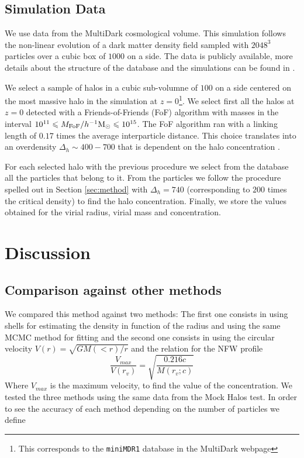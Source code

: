 \documentclass[useAMS,usenatbib]{mn2e}
\newcommand{\hMpc}{{\ifmmode{h^{-1}{\rm Mpc}}\else{$h^{-1}$Mpc }\fi}}
\newcommand{\hMsun}{{\ifmmode{h^{-1}{\rm
        {M_{\odot}}}}\else{$h^{-1}{\rm{M_{\odot}}}$~}\fi}}
\begin{document}
\subsection{Simulation Data}
\label{sec:data}

We use data from the MultiDark cosmological volume. This simulation
follows the non-linear evolution of a dark matter density field
sampled with $2048^3$ particles over a cubic box of $1000$ \hMpc on a
side. The data is publicly available, more details about the structure
of the database and the simulations can be found in
\citep{2013AN....334..691R}.

We select a sample of halos in a cubic sub-volumne of $100$ \hMpc on a
side centered on the most massive halo in the simulation at
$z=0$\footnote{This corresponds to the \texttt{miniMDR1} database in
  the MultiDark webpage}. We select first all the halos at $z=0$
detected with a Friends-of-Friends (FoF) algorithm with masses in the
interval $10^{11}\leq M_{\rm FoF}/\hMsun \leq 10^{15}$. The FoF
algorithm ran with a linking length of $0.17$ times the average
interparticle distance. This choice translates into an overdensity
$\Delta_h\sim 400-700$ that is dependent on the halo concentration
\citep{More2011}.

For each selected halo with the previous procedure we select from the database
all the particles that belong to it. From the particles we follow the
procedure spelled out in Section \ref{sec:method} with $\Delta_h=740$
(corresponding to $200$ times the critical density) to find the
halo concentration. Finally, we store the values obtained for the
virial radius, virial mass and concentration.



\section{Discussion}
\label{sec:discussion}


\subsection{Comparison against other methods}
\label{sec:comparison}
We compared this method against two methods: The first one consists in
using shells for estimating the density in function of the radius and
using the same MCMC method for fitting and the second one consists in
using the circular velocity $V(r)=\sqrt{GM(<r)/r}$ and the relation
for the NFW profile
\begin{equation}
\frac{V_{max}}{V(r_{v})} = \sqrt{\frac{0.216c}{M(r_{v};c)}}
\end{equation}
Where $V_{max}$ is the maximum velocity, to find the value of the concentration. We tested the three methods using the same data from the Mock Halos test. In order to see the accuracy of each method depending on the number of particles we define
\end{document}
